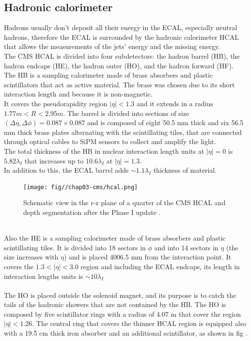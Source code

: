 \subsection{Hadronic calorimeter}
Hadrons usually don't deposit all their energy in the ECAL, especially neutral hadrons, therefore the ECAL is surrounded by the hadronic calorimeter HCAL that allows the measurements of the jets' energy and the missing energy.\\
The CMS HCAL \cite{Green1997TheReport,Anderson2012CMSCalorimeter} is divided into four subdetectors: the hadron barrel (HB), the hadron endcaps (HE), the hadron outer (HO), and the hadron forward (HF).\\
The HB is a sampling calorimeter made of brass absorbers and plastic scintillators that act as active material. The brass was chosen due to its short interaction length and because it is non-magnetic.\\
It covers the pseudorapidity region $|\eta|<1.3$ and it extends in a radius $1.77m<R<2.95m$. The barrel is divided into sections of size $(\Delta \eta, \Delta \phi)=0.087 \times 0.087$ and is composed of eight 50.5 mm thick and six 56.5 mm thick brass plates alternating with the scintillating tiles, that are connected through optical cables to SiPM sensors to collect and amplify the light.\\
The total thickness of the HB in nuclear interaction length units at $|\eta|=0$ is $5.82 \lambda_I$ that increases up to $10.6\lambda_I$ at $|\eta|=1.3$.\\
In addition to this, the ECAL barrel adds $\sim 1.1\lambda_I$ thickness of material.\\
\begin{figure}[h!]
    \centering
    \texttt{[image: fig//chap03-cms/hcal.png]}
    \caption{Schematic view in the r-z plane of a quarter of the CMS HCAL and depth segmentation after the Phase I update \cite{Anderson2012CMSCalorimeter}. }
    \label{fig:hcal}
\end{figure}
\\
Also the HE is a sampling calorimeter made of brass absorbers and plastic scintillating tiles. It is divided into 18 sectors in $\phi$ and into 14 sectors in $\eta$ (the size increases with $\eta$) and is placed 4006.5 mm from the interaction point. It covers the $1.3 < |\eta|<3.0$ region and including the ECAL endcaps, its length in interaction lengths units is $\sim10\lambda_I$\\
\\
The HO is placed outside the solenoid magnet, and its purpose is to catch the tails of the hadronic showers that are not contained by the HB. The HO is composed by five scintillator rings with a radius of 4.07 m that cover the region $|\eta|<1.26$. The central ring that covers the thinner HCAL region is equipped also with a 19.5 cm thick iron absorber and an additional scintillator, as shown in fig .\\
